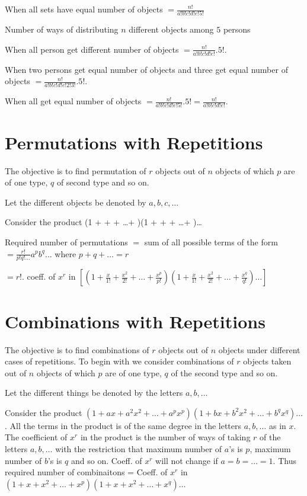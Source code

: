   \item When all sets have equal number of objects $= \frac{n!}{a!b!c!d!e!5!}$
  \stopitemize
\item Number of ways of distributing $n$ different objects among $5$ persons
  \startitemize[i]
  \item When all person get different number of objects $= \frac{n!}{a!b!c!d!e!}.5!$.
  \item When two persons get equal number of objects and three get equal number of objects $= \frac{n!}{a!b!c!d!e!2!3!}.5!$.
  \item When all get equal number of objects $= \frac{n!}{a!b!c!d!e!5!}.5! = \frac{n!}{a!b!c!d!e!}$.
  \stopitemize
\stopitemize

\section{Permutations with Repetitions}
The objective is to find permutation of $r$ objects out of $n$ objects of which $p$ are of one type, $q$ of second type and so on.

Let the different objects be denoted by $a, b, c, \ldots$

Consider the product \startformula \left(1 +  +  + \ldots + \right)\left(1 +  +
 + \ldots + \right)\ldots\stopformula

Required number of permutations $=$ sum of all possible terms of the form $= \frac{r!}{p!q!\ldots}a^pb^q\ldots$ where $p + q + \ldots
= r$

$= r!$. coeff. of $x^r$ in $\left[\left(1 + \frac{x}{1!} + \frac{x^2}{2!} + \ldots + \frac{x^p}{p!}\right)\left(1 + \frac{x}{1!} +
\frac{x^2}{2!} + \ldots + \frac{x^q}{q!}\right)\ldots\right]$

\section{Combinations with Repetitions}
The objective is to find combinations of $r$ objects out of $n$ objects under different cases of repetitions. To begin with we
consider combinations of $r$ objects taken out of $n$ objects of which $p$ are of one type, $q$ of the second type and so on.

Let the different things be denoted by the letters $a, b, \ldots$

Consider the product $(1 + ax + a^2x^2 + \ldots + a^px^p)(1 + bx + b^2x^2 + \ldots + b^qx^q)\ldots$. All the terms in the product
is of the same degree in the letters $a, b, \ldots$ as in $x$. The coefficient of $x^r$ in the product is the number of ways of
taking $r$ of the letters $a, b, \ldots$ with the restriction that maximum number of $a$'s is $p$, maximum number of $b$'s is $q$ and so
on. Coeff. of $x^r$ will not change if $a = b = \ldots = 1$. Thus required number of combinaitons = Coeff. of $x^r$ in $(1 + x + x^2 +
\ldots + x^p)(1 + x + x^2 + \ldots + x^q)\ldots$

